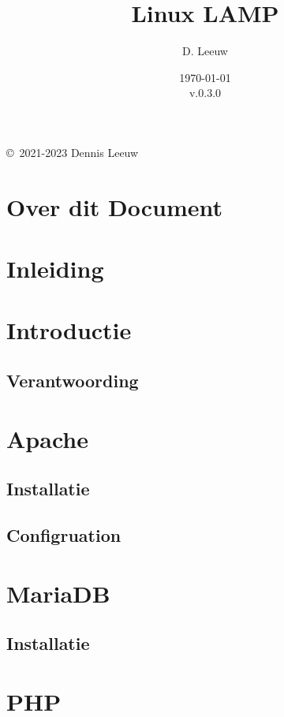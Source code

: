 \documentclass[a4paper,12pt,twoside,openright,titlepage]{book}
\author{D. Leeuw}
\title{Linux LAMP}
\date{\today\\v.0.3.0}
\begin{document}

\maketitle

\copyright\ 2021-2023 Dennis Leeuw\\




\frontmatter
\chapter{Over dit Document}
%
%

\tableofcontents

\mainmatter
\chapter{Inleiding}


\chapter{Introductie}

\section{Verantwoording}


\chapter{Apache}

\section{Installatie}

\section{Configruation}


\chapter{MariaDB}

\section{Installatie}


\chapter{PHP}


\printindex
\end{document}
